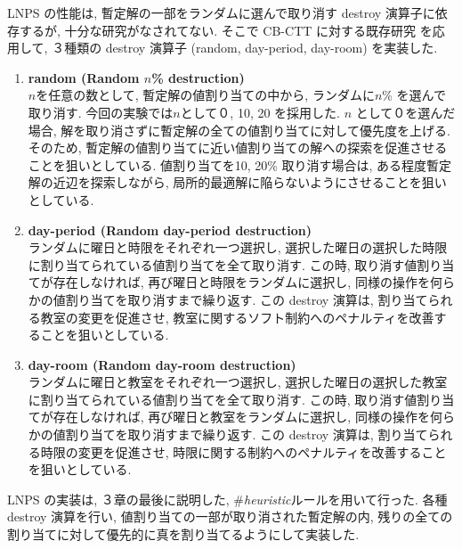 LNPS の性能は, 
暫定解の一部をランダムに選んで取り消す destroy 演算子に依存するが, 
十分な研究がなされてない. 
そこで CB-CTT に対する既存研究
\cite{%
 kiefer16:patat}
 を応用して, 
３種類の destroy 演算子 (random, day-period, day-room) を実装した. 

\newpage

\begin{enumerate}
 \item{\textbf{random (Random $n$\% destruction)}}\\
 $n$を任意の数として, 暫定解の値割り当ての中から, ランダムに$n$\% を選んで取り消す. 今回の実験では$n$として０, 10, 20 を採用した. $n$ として０を選んだ場合, 解を取り消さずに暫定解の全ての値割り当てに対して優先度を上げる. そのため, 暫定解の値割り当てに近い値割り当ての解への探索を促進させることを狙いとしている.  値割り当てを10, 20\% 取り消す場合は, ある程度暫定解の近辺を探索しながら, 局所的最適解に陥らないようにさせることを狙いとしている.

 \item{\textbf{day-period (Random day-period destruction)}}\\
 ランダムに曜日と時限をそれぞれ一つ選択し, 選択した曜日の選択した時限に割り当てられている値割り当てを全て取り消す. この時, 取り消す値割り当てが存在しなければ, 再び曜日と時限をランダムに選択し, 同様の操作を何らかの値割り当てを取り消すまで繰り返す. この destroy 演算は, 割り当てられる教室の変更を促進させ, 教室に関するソフト制約へのペナルティを改善することを狙いとしている.
 
 \item{\textbf{day-room (Random day-room destruction)}}\\
 ランダムに曜日と教室をそれぞれ一つ選択し, 選択した曜日の選択した教室に割り当てられている値割り当てを全て取り消す. この時, 取り消す値割り当てが存在しなければ, 再び曜日と教室をランダムに選択し, 同様の操作を何らかの値割り当てを取り消すまで繰り返す. この destroy 演算は, 割り当てられる時限の変更を促進させ, 時限に関する制約へのペナルティを改善することを狙いとしている.
 
 \end{enumerate}
 
 LNPS の実装は, ３章の最後に説明した, \#\textit{heuristic}ルールを用いて行った. 各種 destroy 演算を行い, 値割り当ての一部が取り消された暫定解の内, 残りの全ての割り当てに対して優先的に真を割り当てるようにして実装した. 

